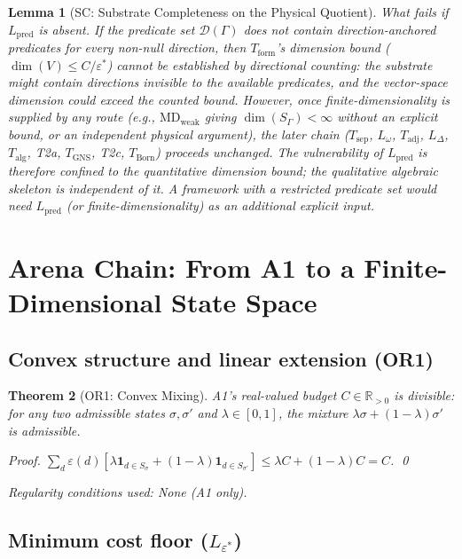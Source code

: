 \documentclass[11pt,a4paper]{article}
\newtheorem{theorem}{Theorem}[section]
\newtheorem{lemma}[theorem]{Lemma}
\theoremstyle{definition}
\newcommand{\eps}{\varepsilon}
\begin{document}
\begin{lemma}[SC: Substrate Completeness on the Physical Quotient]
\smallskip\noindent\textit{What fails if $L_{\mathrm{pred}}$ is absent.}  If the predicate set $\mathcal{D}(\Gamma)$ does not contain direction-anchored predicates for every non-null direction, then $T_{\mathrm{form}}$'s dimension bound ($\dim(V) \le C/\eps^*$) cannot be established by directional counting: the substrate might contain directions invisible to the available predicates, and the vector-space dimension could exceed the counted bound.  However, once finite-dimensionality is supplied by any route (e.g., $\mathrm{MD}_{\mathrm{weak}}$ giving $\dim(S_\Gamma) < \infty$ without an explicit bound, or an independent physical argument), the later chain ($T_{\mathrm{sep}}$, $L_\omega$, $T_{\mathrm{adj}}$, $L_\Delta$, $T_{\mathrm{alg}}$, T2a, $T_{\mathrm{GNS}}$, T2c, $T_{\mathrm{Born}}$) proceeds unchanged.  The vulnerability of $L_{\mathrm{pred}}$ is therefore confined to the \emph{quantitative} dimension bound; the \emph{qualitative} algebraic skeleton is independent of it.  A framework with a restricted predicate set would need $L_{\mathrm{pred}}$ (or finite-dimensionality) as an additional explicit input.
\end{lemma}

\section{Arena Chain: From A1 to a Finite-Dimensional State Space}
\label{sec:arena}

\subsection{Convex structure and linear extension (OR1)}

\begin{theorem}[OR1: Convex Mixing]\label{thm:OR1}
A1's real-valued budget $C \in \mathbb{R}_{>0}$ is divisible: for any two admissible states $\sigma, \sigma'$ and $\lambda \in [0,1]$, the mixture $\lambda\sigma + (1-\lambda)\sigma'$ is admissible.

\noindent\textit{Proof.}  $\sum_d \eps(d)[\lambda \mathbf{1}_{d \in S_\sigma} + (1-\lambda)\mathbf{1}_{d \in S_{\sigma'}}] \le \lambda C + (1-\lambda)C = C$.  \qed

\noindent\textit{Regularity conditions used:} None (A1 only).
\end{theorem}

\subsection{Minimum cost floor ($L_{\eps^*}$)}
\end{document}
